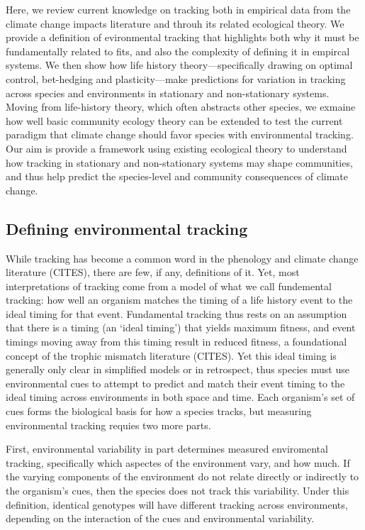 \documentclass[11pt,letterpaper]{article}
\begin{document}
Here, we review current knowledge on tracking both in empirical data from the climate change impacts literature and throuh its related ecological theory. We provide a definition of evironmental tracking that highlights both why it must be fundamentally related to fits, and also the complexity of defining it in empircal systems. We then show how life history theory---specifically drawing on optimal control, bet-hedging and plasticity---make predictions for variation in tracking across species and environments in stationary and non-stationary systems. Moving from life-history theory, which often abstracts other species, we exmaine how well basic community ecology theory can be extended to test the current paradigm that climate change should favor species with environmental tracking. Our aim is provide a framework using existing ecological theory to understand how tracking in stationary and non-stationary systems may shape communities, and thus help predict the species-level and community consequences of climate change.

\subsection{Defining environmental tracking}
While tracking has become a common word in the phenology and climate change literature (CITES), there are few, if any, definitions of it. Yet, most interpretations of tracking come from a model of what we call fundemental tracking: how well an organism matches the timing of a life history event to the ideal timing for that event. Fundamental tracking thus rests on an assumption that there is a timing (an `ideal timing') that yields maximum fitness, and event timings moving away from this timing result in reduced fitness, a foundational concept of the trophic mismatch literature (CITES). Yet this ideal timing is generally only clear in simplified models or in retrospect, thus species must use environmental cues to attempt to predict and match their event timing to the ideal timing across environments in both space and time. Each organism's set of cues forms the biological basis for how a species tracks, but measuring environmental tracking requies two more parts.

First, environmental variability in part determines measured enviromental tracking, specifically which aspectes of the environment vary, and how much. If the varying components of the environment do not relate directly or indirectly to the organism's cues, then the species does not track this variability. Under this definition, identical genotypes will have different tracking across environments, depending on the interaction of the cues and environmental variability.
\end{document}
